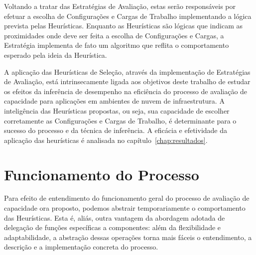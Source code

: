 Voltando a tratar das Estratégias de Avaliação, estas serão responsáveis por efetuar
a escolha de Configurações e Cargas de Trabalho implementando a lógica prevista pelas
Heurísticas. Enquanto as Heurísticas são lógicas que indicam as proximidades onde 
deve ser feita a escolha de Configurações e Cargas, a Estratégia implementa de fato
um algoritmo que reflita o comportamento esperado pela ideia da Heurística.
 
A aplicação das Heurísticas de Seleção, através da implementação de Estratégias 
de Avaliação, está intrinsecamente ligada aos objetivos deste trabalho de estudar 
os efeitos da inferência de desempenho na eficiência do processo de avaliação de 
capacidade para aplicações em ambientes de nuvem de infraestrutura. A inteligência 
das Heurísticas propostas, ou seja, sua capacidade de escolher corretamente as 
Configurações e Cargas de Trabalho, é determinante para o sucesso do processo e 
da técnica de inferência. A eficácia e efetividade da aplicação das heurísticas
é analisada no capítulo~\ref{chap:resultados}. 

\section{Funcionamento do Processo}
\label{sec:funcionamento_processo}
Para efeito de entendimento do funcionamento geral do processo de avaliação de 
capacidade ora proposto, podemos abstrair temporariamente o comportamento das 
Heurísticas. Esta é, aliás, outra vantagem da abordagem adotada de 
delegação de funções específicas a componentes: além da flexibilidade e 
adaptabilidade, a abstração dessas operações torna mais fáceis o entendimento, 
a descrição e a implementação concreta do processo.   

